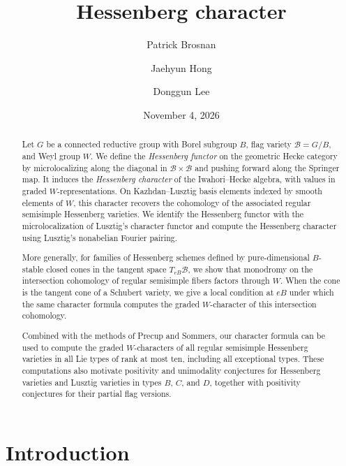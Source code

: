 \documentclass[11pt]{amsart}
\title{Hessenberg character}
\date{November 4, 2026}
\author{Patrick Brosnan}
\author{Jaehyun Hong}
\author{Donggun Lee}
\numberwithin{equation}{section}
\theoremstyle{definition}
\begin{document}
\begin{abstract}
Let $G$ be a connected reductive group with Borel subgroup $B$, flag variety $\mathcal B=G/B$, and Weyl group $W$. We define the \emph{Hessenberg functor} on the geometric Hecke category by microlocalizing along the diagonal in $\mathcal B\times\mathcal B$ and pushing forward along the Springer map. It induces the \emph{Hessenberg character} of the Iwahori--Hecke algebra, with values in graded $W$-representations. On Kazhdan--Lusztig basis elements indexed by smooth elements of $W$, this character recovers the cohomology of the associated regular semisimple Hessenberg varieties. We identify the Hessenberg functor with the microlocalization of Lusztig's character functor and compute the Hessenberg character using Lusztig's nonabelian Fourier pairing.

More generally, for families of Hessenberg schemes defined by pure-dimensional $B$-stable closed cones in the tangent space $T_{eB}\mathcal B$, we show that monodromy on the intersection cohomology of regular semisimple fibers factors through $W$. When the cone is the tangent cone of a Schubert variety, we give a local condition at $eB$ under which the same character formula computes the graded $W$-character of this intersection cohomology.

Combined with the methods of Precup and Sommers, our character formula can be used to compute the graded $W$-characters of all regular semisimple Hessenberg varieties in all Lie types of rank at most ten, including all exceptional types. These computations also motivate positivity and unimodality conjectures for Hessenberg varieties and Lusztig varieties in types $B$, $C$, and $D$, together with positivity conjectures for their partial flag versions.
\end{abstract}

\maketitle
\tableofcontents


\section{Introduction}
\renewcommand{\thetheorem}{\Alph{theorem}}

\end{document}
